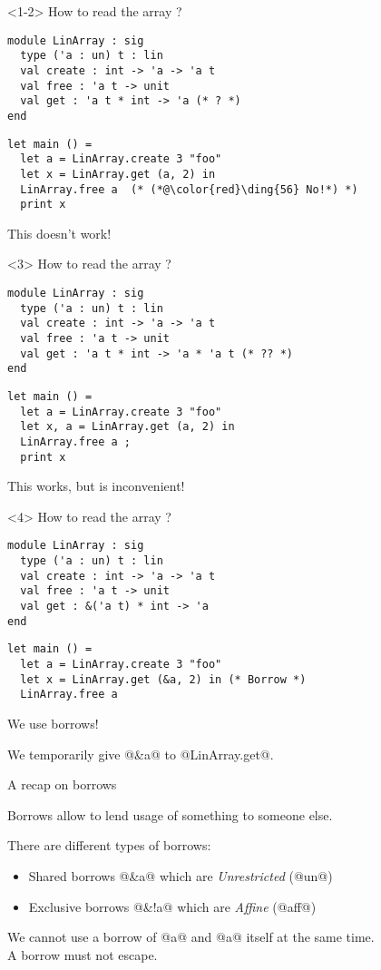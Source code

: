\documentclass[xcolor=svgnames,11pt]{beamer}
\begin{document}
\begin{frame}[t,fragile]

\begin{onlyenv}<1-2>
  How to read the array ?
\begin{lstlisting}
module LinArray : sig
  type ('a : un) t : lin
  val create : int -> 'a -> 'a t
  val free : 'a t -> unit
  val get : 'a t * int -> 'a (* ? *)
end
\end{lstlisting}\pause
\begin{lstlisting}
let main () =
  let a = LinArray.create 3 "foo"
  let x = LinArray.get (a, 2) in
  LinArray.free a  (* (*@\color{red}\ding{56} No!*) *)
  print x
\end{lstlisting}

This doesn't work!
\end{onlyenv}
\begin{onlyenv}<3>
  How to read the array ?
\begin{lstlisting}
module LinArray : sig
  type ('a : un) t : lin
  val create : int -> 'a -> 'a t
  val free : 'a t -> unit
  val get : 'a t * int -> 'a * 'a t (* ?? *)
end
\end{lstlisting}
\begin{lstlisting}
let main () =
  let a = LinArray.create 3 "foo"
  let x, a = LinArray.get (a, 2) in
  LinArray.free a ;
  print x
\end{lstlisting}
This works, but is inconvenient!
\end{onlyenv}
\begin{onlyenv}<4>
  How to read the array ?
\begin{lstlisting}
module LinArray : sig
  type ('a : un) t : lin
  val create : int -> 'a -> 'a t
  val free : 'a t -> unit
  val get : &('a t) * int -> 'a
end
\end{lstlisting}
\begin{lstlisting}
let main () =
  let a = LinArray.create 3 "foo"
  let x = LinArray.get (&a, 2) in (* Borrow *)
  LinArray.free a
\end{lstlisting}
We use borrows!

We temporarily give @&a@ to @LinArray.get@.
\end{onlyenv}
\end{frame}

\begin{frame}[fragile]{A recap on borrows}

  Borrows allow to lend usage of something to someone else.

  There are different types of borrows:
  \begin{itemize}
  \item Shared borrows @&a@ which are \emph{Unrestricted} (@un@)
  \item Exclusive borrows @&!a@ which are \emph{Affine} (@aff@)
  \end{itemize}

  We cannot use a borrow of @a@ and @a@ itself at the same time.\\
  A borrow must not escape.
\end{frame}
\end{document}
